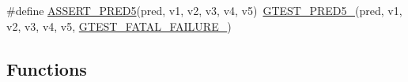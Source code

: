 \begin{DoxyCompactItemize}
\item 
\#define \mbox{\hyperlink{_obj__test_2lib_2googletest-release-1_88_81_2googletest_2include_2gtest_2gtest__pred__impl_8h_af8e510af2b4a14d90eef66ace17d1c30}{A\+S\+S\+E\+R\+T\+\_\+\+P\+R\+E\+D5}}(pred,  v1,  v2,  v3,  v4,  v5)~\mbox{\hyperlink{_obj__test_2lib_2googletest-release-1_88_81_2googletest_2include_2gtest_2gtest__pred__impl_8h_a2c42692f7d910dc2fe57869883190e6c}{G\+T\+E\+S\+T\+\_\+\+P\+R\+E\+D5\+\_\+}}(pred, v1, v2, v3, v4, v5, \mbox{\hyperlink{_obj__test_2lib_2googletest-release-1_88_81_2googletest_2include_2gtest_2internal_2gtest-internal_8h_a0f9a4c3ea82cc7bf4478eaffdc168358}{G\+T\+E\+S\+T\+\_\+\+F\+A\+T\+A\+L\+\_\+\+F\+A\+I\+L\+U\+R\+E\+\_\+}})
\end{DoxyCompactItemize}
\subsection*{Functions}
